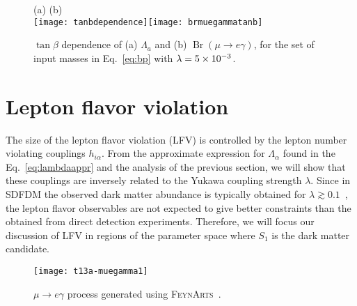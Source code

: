 \begin{figure}
\centering
(a) \hfill (b)\\
\texttt{[image: tanbdependence]}\texttt{[image: brmuegammatanb]}
\caption{$\tan\beta$ dependence of (a) $\Lambda_a$ and (b) $\operatorname{Br}(\mu \rightarrow e \gamma)$, for the set of input masses in Eq.~\eqref{eq:bp} with
$\lambda=\num{5E-3}$.}
\label{fig:Lambdaa}
\end{figure}









\section{Lepton flavor violation}
\label{sec:lept-flav-viol}

The size of the lepton flavor violation (LFV) is controlled by the lepton
number violating couplings $h_{i\alpha}$.  
From the approximate expression for $\Lambda_{\alpha}$ found in the Eq.~\eqref{eq:lambdaappr} and the analysis of the previous section, we
will show that these couplings are inversely related to the Yukawa
coupling strength $\lambda$.
Since in SDFDM the observed dark matter abundance is typically
obtained for $\lambda\gtrsim 0.1$~\cite{Cheung:2013dua}, the lepton
flavor observables are not expected to give better constraints than
the obtained from direct detection experiments. Therefore, we will
focus our discussion of LFV in regions of the parameter space
where $S_1$ is the dark matter candidate.

\begin{figure}[h]
\centering
\texttt{[image: t13a-muegamma1]}
\caption{$\mu \to e \gamma$ process generated using \textsc{FeynArts}~\cite{Hahn:2000kx}.}
\label{fig:muegamma}
\end{figure}

